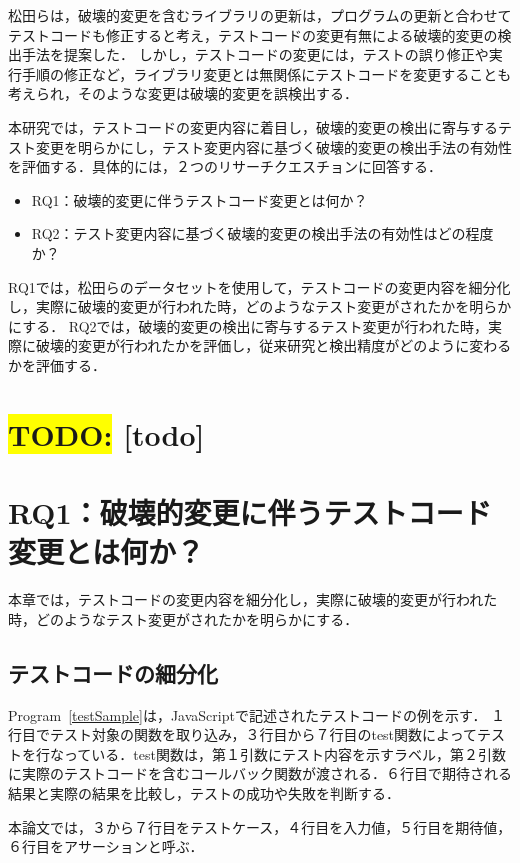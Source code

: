 \documentclass[T,J]{fose} %
\newcommand{\todo}[1]{\colorbox{yellow}{{\bf TODO}:}{\color{red} {\textbf{[#1]}}}}
\begin{document}
松田らは，破壊的変更を含むライブラリの更新は，プログラムの更新と合わせてテストコードも修正すると考え，テストコードの変更有無による破壊的変更の検出手法を提案した．
\cite{maekawa_matsuda}
しかし，テストコードの変更には，テストの誤り修正や実行手順の修正など，ライブラリ変更とは無関係にテストコードを変更することも考えられ，そのような変更は破壊的変更を誤検出する．

本研究では，テストコードの変更内容に着目し，破壊的変更の検出に寄与するテスト変更を明らかにし，テスト変更内容に基づく破壊的変更の検出手法の有効性を評価する．具体的には，２つのリサーチクエスチョンに回答する．

\begin{itemize}
\item RQ1：破壊的変更に伴うテストコード変更とは何か？
\item RQ2：テスト変更内容に基づく破壊的変更の検出手法の有効性はどの程度か？
\end{itemize}

RQ1では，松田らのデータセットを使用して，テストコードの変更内容を細分化し，実際に破壊的変更が行われた時，どのようなテスト変更がされたかを明らかにする．
RQ2では，破壊的変更の検出に寄与するテスト変更が行われた時，実際に破壊的変更が行われたかを評価し，従来研究と検出精度がどのように変わるかを評価する．


\section{\todo{todo}}

\section{RQ1：破壊的変更に伴うテストコード変更とは何か？}
本章では，テストコードの変更内容を細分化し，実際に破壊的変更が行われた時，どのようなテスト変更がされたかを明らかにする．

\subsection{テストコードの細分化}
Program~\ref{testSample}は，JavaScriptで記述されたテストコードの例を示す．
１行目でテスト対象の関数を取り込み，３行目から７行目のtest関数によってテストを行なっている．test関数は，第１引数にテスト内容を示すラベル，第２引数に実際のテストコードを含むコールバック関数が渡される．６行目で期待される結果と実際の結果を比較し，テストの成功や失敗を判断する．

本論文では，３から７行目をテストケース，４行目を入力値，５行目を期待値，６行目をアサーションと呼ぶ．
\end{document}
